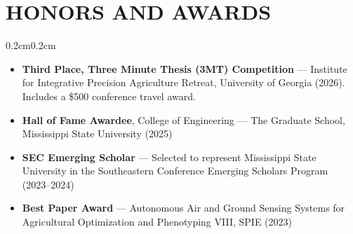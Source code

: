 \documentclass[10pt, letterpaper]{article}
\newenvironment{highlights}{%
    \begin{itemize}[topsep=0.08cm, parsep=0.08cm, partopsep=0pt,
                    itemsep=0pt, leftmargin=0.4cm + 10pt]
}{\end{itemize}}
\newenvironment{onecolentry}{%
    \begin{adjustwidth}{0.2cm}{0.2cm}
}{\end{adjustwidth}}
\begin{document}
\section{HONORS AND AWARDS}
\vspace{0.08cm}
\begin{onecolentry}
    \begin{highlights}
        \item \textbf{Third Place, Three Minute Thesis (3MT) Competition} ---
              Institute for Integrative Precision Agriculture Retreat, University of
              Georgia (2026). Includes a \$500 conference travel award.
        \item \textbf{Hall of Fame Awardee}, College of Engineering ---
              The Graduate School, Mississippi State University (2025)
        \item \textbf{SEC Emerging Scholar} --- Selected to represent Mississippi
              State University in the Southeastern Conference Emerging Scholars
              Program (2023--2024)
        \item \textbf{Best Paper Award} --- Autonomous Air and Ground Sensing Systems
              for Agricultural Optimization and Phenotyping VIII, SPIE (2023)
    \end{highlights}
\end{onecolentry}
\vspace{0.18cm}

\end{document}
